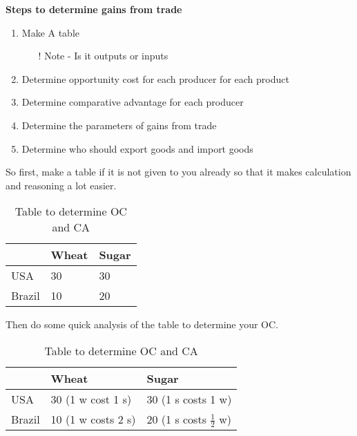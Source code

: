 \newpage
\textbf{Steps to determine gains from trade}
\begin{enumerate}[label=Step \arabic*:]
    \item Make A table
        \begin{itemize}
            \item[!] Note - Is it outputs or inputs
        \end{itemize}
    \item Determine opportunity cost for each producer for each product
    \item Determine comparative advantage for each producer
    \item Determine the parameters of gains from trade
    \item Determine who should export goods and import goods
\end{enumerate}

So first, make a table if it is not given to you already so that it makes calculation and reasoning a lot easier. 
\begin{table}[h!]
    \begin{center}
        \begin{tabular}{l|l|l}
            \toprule
            \textbf{} & \textbf{Wheat} & \textbf{Sugar}\\
            \midrule
            USA & 30 & 30\\
            Brazil & 10 & 20\\
            \bottomrule
        \end{tabular}
        \caption{Table to determine OC and CA}
        \label{tab:usa and brazil}
    \end{center}
\end{table}

Then do some quick analysis of the table to determine your OC.

\begin{table}[h!]
    \begin{center}
        \begin{tabular}{l|l|l}
            \toprule
            \textbf{} & \textbf{Wheat} & \textbf{Sugar}\\
            \midrule
            USA & 30 (1 w cost 1 s) & 30 (1 s costs 1 w)\\
            Brazil & 10 (1 w costs 2 s) & 20 (1 s costs $\frac{1}{2}$ w)\\
            \bottomrule
        \end{tabular}
        \caption{Table to determine OC and CA}
        \label{tab:usa and brazil(oc)}
    \end{center}
\end{table}

